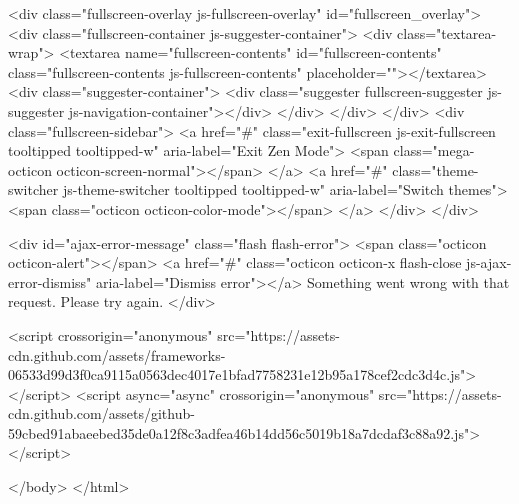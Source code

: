     <div class="fullscreen-overlay js-fullscreen-overlay" id="fullscreen_overlay">
  <div class="fullscreen-container js-suggester-container">
    <div class="textarea-wrap">
      <textarea name="fullscreen-contents" id="fullscreen-contents" class="fullscreen-contents js-fullscreen-contents" placeholder=""></textarea>
      <div class="suggester-container">
        <div class="suggester fullscreen-suggester js-suggester js-navigation-container"></div>
      </div>
    </div>
  </div>
  <div class="fullscreen-sidebar">
    <a href="#" class="exit-fullscreen js-exit-fullscreen tooltipped tooltipped-w" aria-label="Exit Zen Mode">
      <span class="mega-octicon octicon-screen-normal"></span>
    </a>
    <a href="#" class="theme-switcher js-theme-switcher tooltipped tooltipped-w"
      aria-label="Switch themes">
      <span class="octicon octicon-color-mode"></span>
    </a>
  </div>
</div>



    
    

    <div id="ajax-error-message" class="flash flash-error">
      <span class="octicon octicon-alert"></span>
      <a href="#" class="octicon octicon-x flash-close js-ajax-error-dismiss" aria-label="Dismiss error"></a>
      Something went wrong with that request. Please try again.
    </div>


      <script crossorigin="anonymous" src="https://assets-cdn.github.com/assets/frameworks-06533d99d3f0ca9115a0563dec4017e1bfad7758231e12b95a178cef2cdc3d4c.js"></script>
      <script async="async" crossorigin="anonymous" src="https://assets-cdn.github.com/assets/github-59cbed91abaeebed35de0a12f8c3adfea46b14dd56c5019b18a7dcdaf3c88a92.js"></script>
      
      

  </body>
</html>

